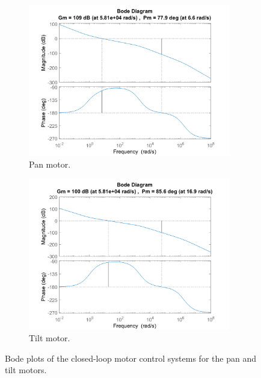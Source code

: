 \documentclass[../../main.tex]{subfiles}
\begin{document}
\begin{figure}[h]
\begin{subfigure}{0.48\textwidth}
    \includegraphics[width = 0.97\textwidth]{Sections/System_Design/Images/SM_PanMotorPos2.png}
    \caption{Pan motor.}
    \label{fig:pos_stability_plot_pan}
\end{subfigure}\quad
\begin{subfigure}{0.48\textwidth}
    \includegraphics[width = 0.97\textwidth]{Sections/System_Design/Images/SM_TiltMotorPos.png}
    \caption{Tilt motor.}
    \label{fig:pos_stability_plot_tilt}
\end{subfigure}
\caption{Bode plots of the closed-loop motor control systems for the pan and tilt motors.}
\label{fig:pos_stability_plot}
\end{figure}
\end{document}
